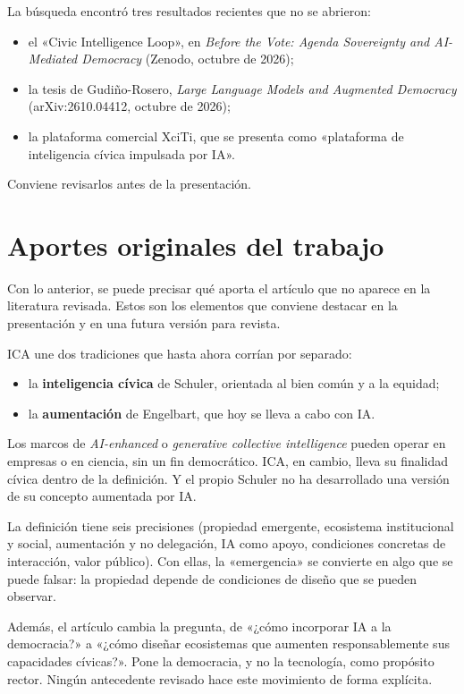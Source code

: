\documentclass[11pt,a4paper]{article}
\begin{document}
\begin{advertencia}
La búsqueda encontró tres resultados recientes que no se abrieron:
\begin{itemize}
  \item el «Civic Intelligence Loop», en \emph{Before the Vote: Agenda Sovereignty and AI-Mediated Democracy} (Zenodo, octubre de 2026);
  \item la tesis de Gudiño-Rosero, \emph{Large Language Models and Augmented Democracy} (arXiv:2610.04412, octubre de 2026);
  \item la plataforma comercial XciTi, que se presenta como «plataforma de inteligencia cívica impulsada por IA».
\end{itemize}
Conviene revisarlos antes de la presentación.
\end{advertencia}

\section{Aportes originales del trabajo}\label{sec:aportes}

Con lo anterior, se puede precisar qué aporta el artículo que no aparece en la literatura revisada. Estos son los elementos que conviene destacar en la presentación y en una futura versión para revista.

\begin{original}
ICA une dos tradiciones que hasta ahora corrían por separado:
\begin{itemize}
  \item la \textbf{inteligencia cívica} de Schuler, orientada al bien común y a la equidad;
  \item la \textbf{aumentación} de Engelbart, que hoy se lleva a cabo con IA.
\end{itemize}
Los marcos de \emph{AI-enhanced} o \emph{generative collective intelligence} pueden operar en empresas o en ciencia, sin un fin democrático. ICA, en cambio, lleva su finalidad cívica dentro de la definición. Y el propio Schuler no ha desarrollado una versión de su concepto aumentada por IA.
\end{original}

\begin{original}
La definición tiene seis precisiones (propiedad emergente, ecosistema institucional y social, aumentación y no delegación, IA como apoyo, condiciones concretas de interacción, valor público). Con ellas, la «emergencia» se convierte en algo que se puede falsar: la propiedad depende de condiciones de diseño que se pueden observar.

Además, el artículo cambia la pregunta, de «¿cómo incorporar IA a la democracia?» a «¿cómo diseñar ecosistemas que aumenten responsablemente sus capacidades cívicas?». Pone la democracia, y no la tecnología, como propósito rector. Ningún antecedente revisado hace este movimiento de forma explícita.
\end{original}
\end{document}
